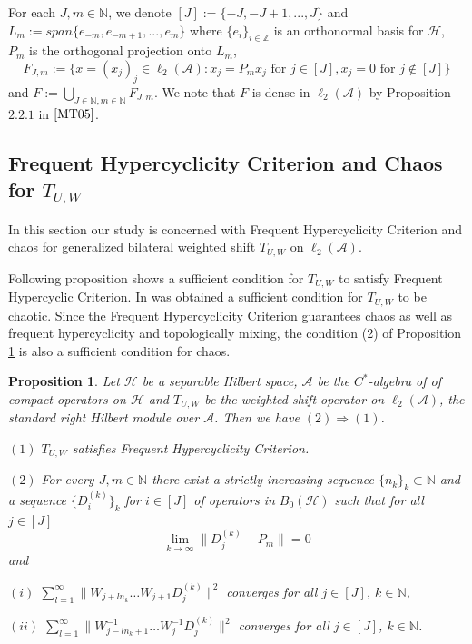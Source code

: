 \documentclass{article}
\newtheorem {proposition}[theorem]{Proposition}
\begin{document}
For each $J, m \in\mathbb{N}$,  we denote $[J]:=\{-J, -J+1,..., J\}$ and $L_{m}:=span\{e_{-m}, e_{-m+1},..., e_{m}\}$  where $\{e_{i}\}_{i\in\mathbb{Z}}$ is an orthonormal basis for $\mathcal{H}$, $P_{m}$ is the orthogonal projection onto $L_{m}$,
\[F_{J,m}:=\{x=(x_{j})_{j}\in\ell_{2}(\mathcal{A}):x_{j}=P_{m}x_{j} \textrm{ for } j\in [J], x_{j}=0 \textrm{ for } j\notin[J]\} \]
and $F:=\bigcup_{J\in \mathbb{N}, m\in\mathbb{N}}F_{J,m}$. We note that $F$ is dense in $\ell_{2}(\mathcal{A})$ by Proposition $2.2.1$ in $\cite{MT05}$.


\subsection{Frequent Hypercyclicity Criterion and Chaos for $T_{U,W}$}

In this section our study is concerned with Frequent Hypercyclicity Criterion and chaos for generalized bilateral weighted shift $T_{U,W}$ on $\ell_{2}(\mathcal{A})$.

Following proposition shows a sufficient condition for $T_{U,W}$ to satisfy Frequent Hypercyclic Criterion.
In \cite{I24} was obtained a sufficient condition for $T_{U,W}$ to be chaotic.
 Since the Frequent Hypercyclicity Criterion guarantees chaos as well as frequent hypercyclicity and topologically mixing,  the condition (2) of Proposition \ref{pro4.1} is also a sufficient condition for chaos.


\begin{proposition}\label{pro4.1}
Let $\mathcal{H}$ be a separable Hilbert space, $\mathcal{A}$ be the $C^{\ast}$-algebra of of compact operators on $\mathcal{H}$ and $T_{U,W}$ be the weighted shift operator on $\ell_{2}(\mathcal{A})$, the standard right Hilbert module over $\mathcal{A}$. Then we have $(2)\Rightarrow (1)$.

$(1)$ $T_{U, W}$ satisfies Frequent Hypercyclicity Criterion.

$(2)$ For every $J,m\in\mathbb{N}$ there exist a strictly increasing sequence $\{n_{k}\}_{k}\subset \mathbb{N}$ and a sequence $\{D^{(k)}_{i}\}_{k}$ for $i\in [J]$ of operators in $B_{0}(\mathcal{H})$ such that for all $j\in[J]$
\[\lim_{k\rightarrow\infty}\|D^{(k)}_{j}-P_{m}\|=0\]
and

$(i)$ $\sum^{\infty}_{l=1}\|W_{j+ln_{k}}\ldots W_{j+1}D^{(k)}_{j}\|^{2}$ converges for all $j\in[J]$, $k\in \mathbb{N}$,

$(ii)$ $\sum^{\infty}_{l=1}\|W^{-1}_{j-ln_{k}+1}\ldots W^{-1}_{j}D^{(k)}_{j}\|^{2}$ converges for all $j\in[J]$, $k\in \mathbb{N}$.
\end{proposition}
\end{document}
